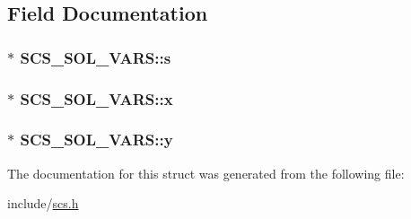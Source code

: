 \subsection{Field Documentation}
\hypertarget{struct_s_c_s___s_o_l___v_a_r_s_aa3c4c55b3bab23bd2f31398e85ab2ff8}{
\subsubsection[{s}]{ $\ast$ S\-C\-S\-\_\-\-S\-O\-L\-\_\-\-V\-A\-R\-S\-::s}}\label{struct_s_c_s___s_o_l___v_a_r_s_aa3c4c55b3bab23bd2f31398e85ab2ff8}
\hypertarget{struct_s_c_s___s_o_l___v_a_r_s_ab2de804a2fdb2a007b99ecdcf502c388}{
\subsubsection[{x}]{$\ast$ S\-C\-S\-\_\-\-S\-O\-L\-\_\-\-V\-A\-R\-S\-::x}}\label{struct_s_c_s___s_o_l___v_a_r_s_ab2de804a2fdb2a007b99ecdcf502c388}
\hypertarget{struct_s_c_s___s_o_l___v_a_r_s_ae1b7e54f2239aaf72d812f0172bf27d1}{
\subsubsection[{y}]{ $\ast$ S\-C\-S\-\_\-\-S\-O\-L\-\_\-\-V\-A\-R\-S\-::y}}\label{struct_s_c_s___s_o_l___v_a_r_s_ae1b7e54f2239aaf72d812f0172bf27d1}


The documentation for this struct was generated from the following file\-:\begin{DoxyCompactItemize}
\item 
include/\hyperlink{scs_8h}{scs.\-h}\end{DoxyCompactItemize}
